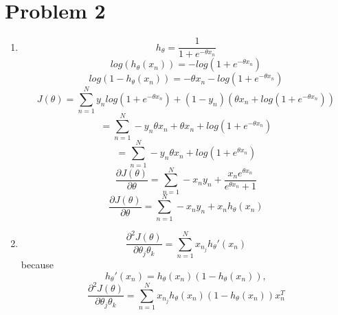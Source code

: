\documentclass[11pt]{article}
\begin{document}
\section{Problem 2}
    \begin{enumerate}
        \item 
            \begin{equation}
                h_{\theta} = \frac{1}{1+e^{-\theta x_{n}}}
            \end{equation}
            \begin{equation}
                log(h_{\theta}(x_{n})) = -log(1+e^{-\theta x_{n}})
            \end{equation}
            \begin{equation}
                log(1-h_{\theta}(x_{n})) = -\theta x_{n}-log(1+e^{-\theta x_{n}})
            \end{equation}
            \begin{equation}
                J(\theta) = \sum_{n=1}^{N} y_{n} log(1+e^{-\theta x_{n}}) + (1-y_{n})(\theta x_{n}+log(1+e^{-\theta x_n}))
            \end{equation}
            \begin{equation}
                = \sum_{n=1}^{N} -y_{n}\theta x_{n} + \theta x_{n} + log(1+e^{-\theta x_{n}})
            \end{equation}
            \begin{equation}
                = \sum_{n=1}^{N} -y_{n}\theta x_{n} + log(1+e^{\theta x_{n}})
            \end{equation}
            \begin{equation}
                \frac{\partial J(\theta)}{\partial \theta} = 
                    \sum_{n=1}^{N} -x_{n}y_{n} + \frac{x_{n}e^{\theta x_{n}}}{e^{\theta x_{n}}+1}
            \end{equation}
            \begin{equation}
                \frac{\partial J(\theta)}{\partial \theta} = 
                    \sum_{n=1}^{N} -x_{n}y_{n} + x_{n}h_{\theta}(x_{n})
            \end{equation}
            
            
        \item
            \begin{equation}
                \frac{\partial ^{2}J(\theta)}{\partial \theta _{j}\theta _{k}} = 
                    \sum_{n=1}^{N} x_{n_{j}}h_{\theta}'(x_{n})
            \end{equation}
            because
            \begin{equation}
                h_{\theta}'(x_{n}) = h_{\theta}(x_{n})(1-h_{\theta}(x_{n})) ,
            \end{equation}
            \begin{equation}
                \frac{\partial ^{2}J(\theta)}{\partial \theta _{j}\theta _{k}} = 
                    \sum_{n=1}^{N} x_{n_{j}}h_{\theta}(x_{n})(1-h_{\theta}(x_{n}))x_{n}^{T}
            \end{equation}
        

\end{enumerate}
\end{document}
